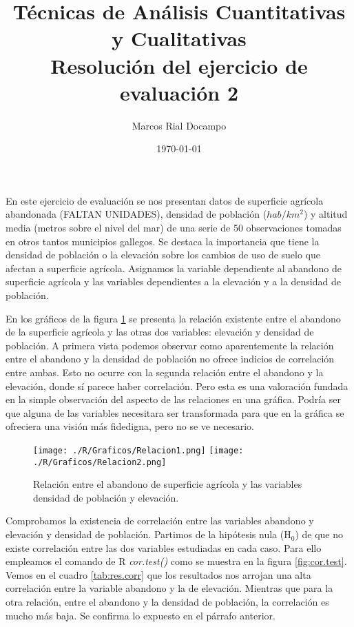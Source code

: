 \documentclass[11pt,a4paper]{article}
\author{Marcos Rial Docampo}
\title{Técnicas de Análisis Cuantitativas y Cualitativas\\Resolución del ejercicio de evaluación 2}
\date{\small{\today}}
\begin{document}
\maketitle

En este ejercicio de evaluación se nos presentan datos de superficie agrícola abandonada (FALTAN UNIDADES), densidad de población ($hab/km^{2}$) y altitud media (metros sobre el nivel del mar) de una serie de 50 observaciones tomadas en otros tantos municipios gallegos. Se destaca la importancia que tiene la densidad de población o la elevación sobre los cambios de uso de suelo que afectan a superficie agrícola. Asignamos la variable dependiente al abandono de superficie agrícola y las variables dependientes a la elevación y a la densidad de población.

En los gráficos de la figura \ref{fig:graficas} se presenta la relación existente entre el abandono de la superficie agrícola y las otras dos variables: elevación y densidad de población. A primera vista podemos observar como aparentemente la relación entre el abandono y la densidad de población no ofrece indicios de correlación entre ambas. Esto no ocurre con la segunda relación entre el abandono y la elevación, donde sí parece haber correlación. Pero esta es una valoración fundada en la simple observación del aspecto de las relaciones en una gráfica. Podría ser que alguna de las variables necesitara ser transformada para que en la gráfica se ofreciera una visión más fidedigna, pero no se ve necesario.

\begin{figure}
	\centering
	\texttt{[image: ./R/Graficos/Relacion1.png]}
	\texttt{[image: ./R/Graficos/Relacion2.png]}
	\caption{Relación entre el abandono de superficie agrícola y las variables densidad de población y elevación.}
	\label{fig:graficas}
\end{figure}

Comprobamos la existencia de correlación entre las variables abandono y elevación y densidad de población. Partimos de la hipótesis nula (H$_0$) de que no existe correlación entre las dos variables estudiadas en cada caso. Para ello empleamos el comando de R \textit{cor.test()} como se muestra en la figura \ref{fig:cor.test}. Vemos en el cuadro \ref{tab:res.corr} que los resultados nos arrojan una alta correlación entre la variable abandono y la de elevación. Mientras que para la otra relación, entre el abandono y la densidad de población, la correlación es mucho más baja. Se confirma lo expuesto en el párrafo anterior.
\end{document}
